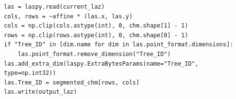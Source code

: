 \begin{lstlisting}[label={lst:point-tagging}, caption={[3D-Point-Tagging zur Punktwolkensegmentierung]Übertragung der Raster-Segmentierungs-ID in den 3D-Punkteraum}, breaklines=true, breakatwhitespace=true]
las = laspy.read(current_laz)
cols, rows = ~affine * (las.x, las.y)
cols = np.clip(cols.astype(int), 0, chm.shape[1] - 1)
rows = np.clip(rows.astype(int), 0, chm.shape[0] - 1)
if "Tree_ID" in [dim.name for dim in las.point_format.dimensions]:
    las.point_format.remove_dimension("Tree_ID")
las.add_extra_dim(laspy.ExtraBytesParams(name="Tree_ID", type=np.int32))
las.Tree_ID = segmented_chm[rows, cols]
las.write(output_laz)
\end{lstlisting}